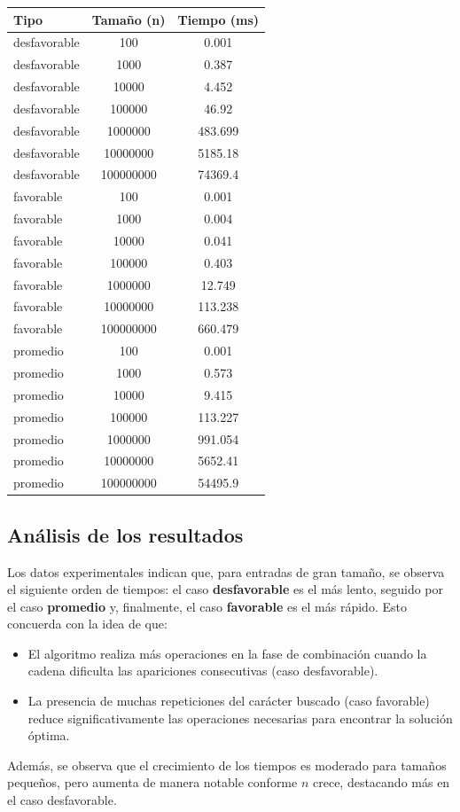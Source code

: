 \documentclass[12pt,a4paper]{article}
\begin{document}
\begin{center}
\begin{tabular}{lcc}
\toprule
\textbf{Tipo} & \textbf{Tamaño (n)} & \textbf{Tiempo (ms)} \\
\midrule
desfavorable & 100         & 0.001 \\
desfavorable & 1000        & 0.387 \\
desfavorable & 10000       & 4.452 \\
desfavorable & 100000      & 46.92 \\
desfavorable & 1000000     & 483.699 \\
desfavorable & 10000000    & 5185.18 \\
desfavorable & 100000000   & 74369.4 \\
\midrule
favorable    & 100         & 0.001 \\
favorable    & 1000        & 0.004 \\
favorable    & 10000       & 0.041 \\
favorable    & 100000      & 0.403 \\
favorable    & 1000000     & 12.749 \\
favorable    & 10000000    & 113.238 \\
favorable    & 100000000   & 660.479 \\
\midrule
promedio     & 100         & 0.001 \\
promedio     & 1000        & 0.573 \\
promedio     & 10000       & 9.415 \\
promedio     & 100000      & 113.227 \\
promedio     & 1000000     & 991.054 \\
promedio     & 10000000    & 5652.41 \\
promedio     & 100000000   & 54495.9 \\
\bottomrule
\end{tabular}
\end{center}

\subsection{Análisis de los resultados}
Los datos experimentales indican que, para entradas de gran tamaño, se observa el siguiente orden de tiempos: el caso \textbf{desfavorable} es el más lento, seguido por el caso \textbf{promedio} y, finalmente, el caso \textbf{favorable} es el más rápido. Esto concuerda con la idea de que:
\begin{itemize}
    \item El algoritmo realiza más operaciones en la fase de combinación cuando la cadena dificulta las apariciones consecutivas (caso desfavorable).
    \item La presencia de muchas repeticiones del carácter buscado (caso favorable) reduce significativamente las operaciones necesarias para encontrar la solución óptima.
\end{itemize}
Además, se observa que el crecimiento de los tiempos es moderado para tamaños pequeños, pero aumenta de manera notable conforme \( n \) crece, destacando más en el caso desfavorable.
\end{document}
